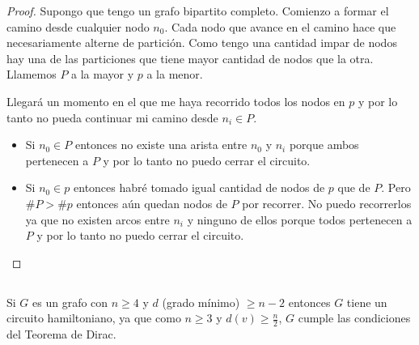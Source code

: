\begin{proof}
    Supongo que tengo un grafo bipartito completo. Comienzo a formar el camino desde cualquier nodo $n_0$. Cada nodo que avance en el camino hace que necesariamente alterne de partición. Como tengo una cantidad impar de nodos hay una de las particiones que tiene mayor cantidad de nodos que la otra. Llamemos $P$ a la mayor y $p$ a la menor.

    Llegará un momento en el que me haya recorrido todos los nodos en $p$ y por lo tanto no pueda continuar mi camino desde $n_i \in P$.

    \begin{itemize}
        \item Si $n_0 \in P$ entonces no existe una arista entre $n_0$ y $n_i$ porque ambos pertenecen a $P$ y por lo tanto no puedo cerrar el circuito.
        \item Si $n_0 \in p$ entonces habré tomado igual cantidad de nodos de $p$ que de $P$. Pero $\#P > \#p$ entonces aún quedan nodos de $P$ por recorrer. No puedo recorrerlos ya que no existen arcos entre $n_i$ y ninguno de ellos porque todos pertenecen a $P$ y por lo tanto no puedo cerrar el circuito.
    \end{itemize}
\end{proof}

\subsection{}

Si $G$ es un grafo con $n \geq 4$ y $d$ (grado mínimo) $\geq n - 2$ entonces $G$ tiene un circuito hamiltoniano, ya que como $n \geq 3$ y $d(v) \geq \frac{n}{2}$, $G$ cumple las condiciones del Teorema de Dirac. 
